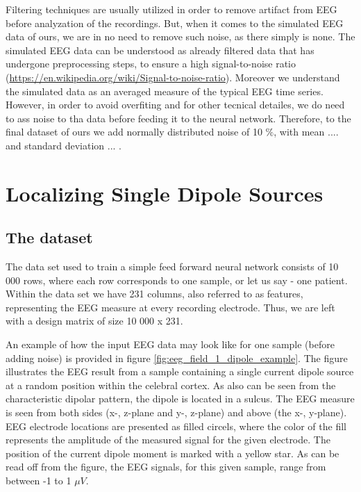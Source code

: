 \documentclass[a4paper, UKenglish, 11pt]{uiomaster}
\begin{document}
Filtering techniques are usually utilized in order to remove artifact from EEG before analyzation of the recordings. But, when it comes to the simulated EEG data of ours, we are in no need to remove such noise, as there simply is none. The simulated EEG data can be understood as already filtered data that has undergone preprocessing steps, to ensure a high signal-to-noise ratio (\url{https://en.wikipedia.org/wiki/Signal-to-noise-ratio}). Moreover we understand the simulated data as an averaged measure of the typical EEG time series. However, in order to avoid overfiting and for other tecnical detailes, we do need to ass noise to tha data before feeding it to the neural network. Therefore, to the final dataset of ours we add normally distributed noise of 10 $\%$, with mean .... and standard deviation ... .


\section{Localizing Single Dipole Sources}

\subsection{The dataset}
The data set used to train a simple feed forward neural network consists of 10 000 rows, where each row corresponds to one sample, or let us say - one patient. Within the data set we have 231 columns, also referred to as features, representing the EEG measure at every recording electrode. Thus, we are left with a design matrix of size 10 000 x 231.

An example of how the input EEG data may look like for one sample (before adding noise) is provided in figure \ref{fig:eeg_field_1_dipole_example}. The figure illustrates the EEG result from a sample containing a single current dipole source at a random position within the celebral cortex. As also can be seen from the characteristic dipolar pattern, the dipole is located in a sulcus. The EEG measure is seen from both sides (x-, z-plane and y-, z-plane) and above (the x-, y-plane). EEG electrode locations are presented as filled circels, where the color of the fill represents the amplitude of the measured signal for the given electrode. The position of the current dipole moment is marked with a yellow star. As can be read off from the figure, the EEG signals, for this given sample, range from between -1 to 1 $\mu V$.
\end{document}
